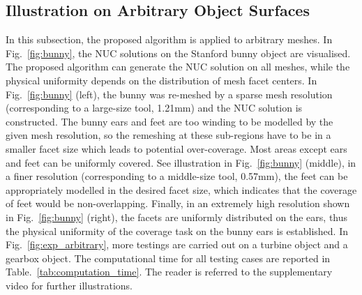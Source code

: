 \documentclass[lettersize,journal]{IEEEtran}
\begin{document}
\subsection{Illustration on Arbitrary Object Surfaces}
In this subsection, the proposed algorithm is applied to arbitrary meshes. 
In Fig.~\ref{fig:bunny}, the NUC solutions on the Stanford bunny object are visualised. 
The proposed algorithm can generate the NUC solution on all meshes, while the physical uniformity depends on the distribution of mesh facet centers. 
In Fig.~\ref{fig:bunny} (left), the bunny was re-meshed by a sparse mesh resolution (corresponding to a large-size tool, 1.21mm) and the NUC solution is constructed. The bunny ears and feet are too winding to be modelled by the given mesh resolution, so the remeshing at these sub-regions have to be in a smaller facet size which leads to potential over-coverage. 
Most areas except ears and feet can be uniformly covered. 
See illustration in Fig.~\ref{fig:bunny} (middle), in a finer resolution (corresponding to a middle-size tool, 0.57mm), the feet can be appropriately modelled in the desired facet size, which indicates that the coverage of feet would be non-overlapping. 
Finally, in an extremely high resolution shown in Fig.~\ref{fig:bunny} (right), the facets are uniformly distributed on the ears, thus the physical uniformity of the coverage task on the bunny ears is established. 
In Fig.~\ref{fig:exp_arbitrary}, more testings are carried out on a turbine object and a gearbox object. 
The computational time for all testing cases are reported in Table.~\ref{tab:computation_time}. 
The reader is referred to the supplementary video for further illustrations. 
\end{document}
